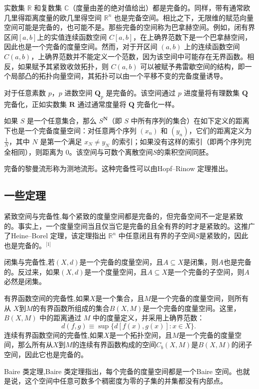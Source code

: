 实数集 $\mathbb{R}$ 和复数集 $\mathbb{C}$（度量由差的绝对值给出）都是完备的。同样，带有通常欧几里得距离度量的欧几里得空间 $\mathbb{R}^n$ 也是完备空间。相比之下，无限维的赋范向量空间可能是完备的，也可能不是。那些完备的空间称为巴拿赫空间。例如，闭有界区间$[a, b]$上的实值连续函数空间 $C[a,b]$，在上确界范数下是一个巴拿赫空间，因此也是一个完备的度量空间。然而，对于开区间 $(a, b)$ 上的连续函数空间 $C(a,b)$，上确界范数并不能定义一个范数，因为该空间中可能存在无界函数。相反，如果赋予其紧致收敛拓扑，则 $C(a,b)$ 可以被赋予弗雷歇空间的结构，即一个局部凸的拓扑向量空间，其拓扑可以由一个平移不变的完备度量诱导。


对于任意素数 $p$，$p$ 进数空间 $\mathbf{Q}_p$ 是完备的。该空间通过 $p$ 进度量将有理数集 $\mathbf{Q}$ 完备化，正如实数集 $\mathbf{R}$ 通过通常度量将 $\mathbf{Q}$ 完备化一样。

如果 $S$ 是一个任意集合，那么 $S^{\mathbf{N}}$（即 $S$ 中所有序列的集合）在如下定义的距离下也是一个完备度量空间：对任意两个序列 $\left(x_n\right)$ 和 $\left(y_n\right)$，它们的距离定义为$\frac{1}{N}$，其中 $N$ 是第一个满足 $x_N \neq y_N$ 的索引；如果没有这样的索引（即两个序列完全相同），则距离为 $0$。该空间与可数个离散空间$S$的乘积空间同胚。

完备的黎曼流形称为测地流形。这种完备性可以由Hopf–Rinow 定理推出。
\subsection{一些定理}
紧致空间与完备性,每个紧致的度量空间都是完备的，但完备空间不一定是紧致的。事实上，一个度量空间当且仅当它是完备的且全有界的时才是紧致的。这推广了Heine–Borel 定理，该定理指出 $\mathbb{R}^n$ 中任意闭且有界的子空间$S$是紧致的，因此也是完备的。\(^\text{[1]}\)

闭集与完备性,若$(X,d)$是一个完备的度量空间，且$A \subseteq X$是闭集，则$A$也是完备的。反过来，如果$(X,d)$是一个度量空间，且$A \subseteq X$是一个完备的子空间，则$A$必然是闭集。

有界函数空间的完备性,如果$X$是一个集合，且$M$是一个完备的度量空间，则所有从 $X$到$M$的有界函数所组成的集合$B(X,M)$是一个完备的度量空间。这里，$B(X,M)$ 中的距离通过 $M$ 中的度量定义，并采用上确界范数：
  $$
  d(f,g) \equiv \sup \{ d[f(x),g(x)] : x \in X \}.~
  $$
连续有界函数空间的完备性,如果$X$是一个拓扑空间，且$M$是一个完备的度量空间，那么所有从$X$到$M$的连续有界函数构成的空间$C_b(X,M)$是$B(X,M)$的闭子空间，因此它也是完备的。

Baire 类定理,Baire 类定理指出，每个完备的度量空间都是一个Baire 空间。也就是说，这个空间中任意可数多个稠密度为零的子集的并集都没有内部点。

